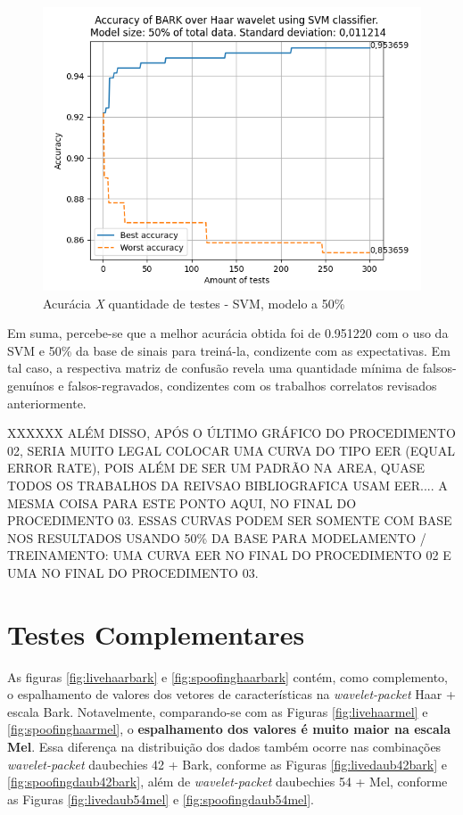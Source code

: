 			\newpage
			\begin{figure}
				\centering
				\includegraphics{images/results/confusionMatrices/classifier_SVM_50.png}
				\caption{Acurácia \textit{X} quantidade de testes - SVM, modelo a 50\%}
				\label{fig:classifiersvm50}
			\end{figure}
			
		
		    \par Em suma, percebe-se que a melhor acurácia obtida foi de 0.951220 com o uso da SVM e 50\% da base de sinais para treiná-la, condizente com as expectativas. Em tal caso, a respectiva matriz de confusão revela uma quantidade mínima de falsos-genuínos e falsos-regravados, condizentes com os trabalhos correlatos revisados anteriormente. 
		    
		    
		    \par XXXXXX ALÉM DISSO, APÓS O ÚLTIMO GRÁFICO DO PROCEDIMENTO 02, SERIA MUITO LEGAL COLOCAR UMA CURVA DO TIPO EER (EQUAL ERROR RATE), POIS ALÉM DE SER UM PADRÃO NA AREA, QUASE TODOS OS TRABALHOS DA REIVSAO BIBLIOGRAFICA USAM EER.... A MESMA COISA PARA ESTE PONTO AQUI, NO FINAL DO PROCEDIMENTO 03. ESSAS CURVAS PODEM SER SOMENTE COM BASE NOS RESULTADOS USANDO 50\% DA BASE PARA MODELAMENTO / TREINAMENTO: UMA CURVA EER NO FINAL DO PROCEDIMENTO 02 E UMA NO FINAL DO  PROCEDIMENTO 03.
	
	\section{Testes Complementares}
	\label{chap:testsResults:sec:Experimento05}
		As figuras \ref{fig:livehaarbark} e \ref{fig:spoofinghaarbark} contém, como complemento, o espalhamento de valores dos vetores de características na \textit{wavelet-packet} Haar + escala Bark. Notavelmente, comparando-se com as Figuras \ref{fig:livehaarmel} e \ref{fig:spoofinghaarmel}, o \textbf{espalhamento dos valores é muito maior na escala \textbf{Mel}}. Essa diferença na distribuição dos dados também ocorre nas combinações \textit{wavelet-packet} daubechies 42 + Bark, conforme as Figuras \ref{fig:livedaub42bark} e \ref{fig:spoofingdaub42bark}, além de \textit{wavelet-packet} daubechies 54 + Mel, conforme as Figuras \ref{fig:livedaub54mel} e \ref{fig:spoofingdaub54mel}.
		
